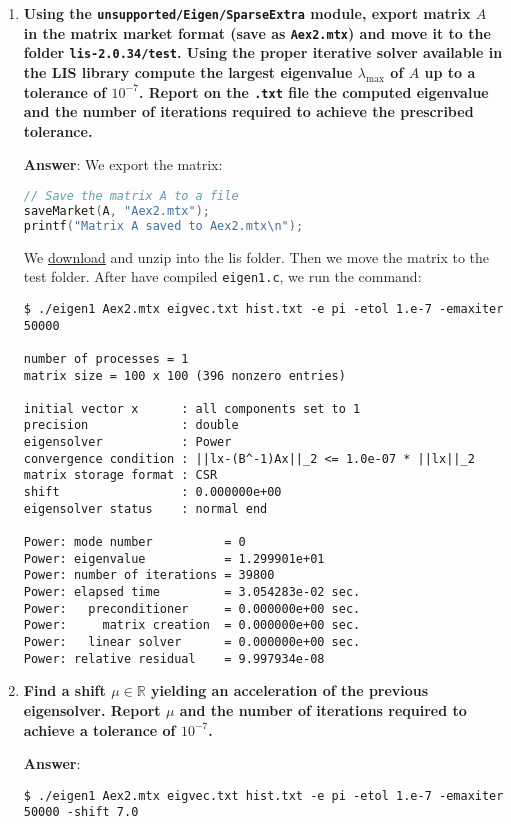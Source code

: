 \begin{enumerate}[label=\textcolor{Green3}{\textbf{\arabic*.}}]
    \item \textcolor{Green3}{\textbf{%
        Using the \texttt{unsupported/Eigen/SparseExtra} module, export matrix $A$ in the matrix market format (save as \texttt{Aex2.mtx}) and move it to the folder \texttt{lis-2.0.34/test}. Using the proper iterative solver available in the LIS library compute the largest eigenvalue $\lambda_{\max}$ of $A$ up to a tolerance of $10^{-7}$. Report on the \texttt{.txt} file the computed eigenvalue and the number of iterations required to achieve the prescribed tolerance.
    }}

    \textbf{Answer}: We export the matrix:
    \begin{lstlisting}[language=C++]
// Save the matrix A to a file
saveMarket(A, "Aex2.mtx");
printf("Matrix A saved to Aex2.mtx\n");\end{lstlisting}
    We \href{https://www.ssisc.org/lis/dl/lis-2.1.6.zip}{download} and unzip into the lis folder. Then we move the matrix to the test folder. After have compiled \texttt{eigen1.c}, we run the command:
    \begin{lstlisting}[mathescape=false]
$ ./eigen1 Aex2.mtx eigvec.txt hist.txt -e pi -etol 1.e-7 -emaxiter 50000

number of processes = 1
matrix size = 100 x 100 (396 nonzero entries)

initial vector x      : all components set to 1
precision             : double
eigensolver           : Power
convergence condition : ||lx-(B^-1)Ax||_2 <= 1.0e-07 * ||lx||_2
matrix storage format : CSR
shift                 : 0.000000e+00
eigensolver status    : normal end

Power: mode number          = 0
Power: eigenvalue           = 1.299901e+01
Power: number of iterations = 39800
Power: elapsed time         = 3.054283e-02 sec.
Power:   preconditioner     = 0.000000e+00 sec.
Power:     matrix creation  = 0.000000e+00 sec.
Power:   linear solver      = 0.000000e+00 sec.
Power: relative residual    = 9.997934e-08\end{lstlisting}


    \newpage

    \item \textcolor{Green3}{\textbf{%
        Find a shift $\mu \in \mathbb{R}$ yielding an acceleration of the previous eigensolver. Report $\mu$ and the number of iterations required to achieve a tolerance of $10^{-7}$.
    }}

    \textbf{Answer}:
    \begin{lstlisting}[mathescape=false]
$ ./eigen1 Aex2.mtx eigvec.txt hist.txt -e pi -etol 1.e-7 -emaxiter 50000 -shift 7.0


\end{lstlisting}
\end{enumerate}

